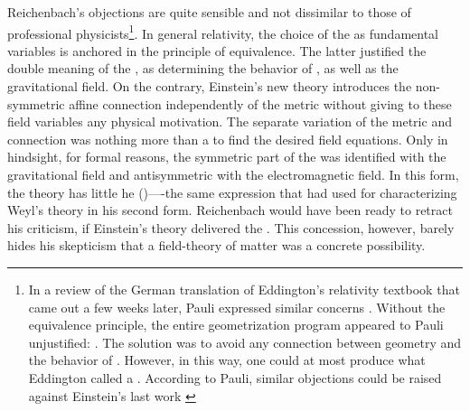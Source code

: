 \documentclass[draft]{article}
\newcommand{\WT}{Weyl's theory\xspace}
\begin{document}
Reichenbach's objections are quite sensible and not dissimilar to those of professional physicists\footnote{In a review of the German translation \citep{Eddington1925} of Eddington's relativity textbook \citep{Eddington1923} that came out a few weeks later, Pauli expressed similar concerns \citet{Pauli1926}. Without the equivalence principle, the entire geometrization program appeared to Pauli unjustified:  \citep{Pauli1926}. The solution was to avoid any connection between geometry and the behavior of \rac. However, in this way, one could at most produce what Eddington called a . According to Pauli, similar objections could be raised against Einstein's last work \citep{Einstein1925}}. In general relativity, the choice of the \gmn as fundamental variables is anchored in the principle of equivalence. The latter justified the double meaning of the \gmn, as determining the behavior of \rac, as well as the gravitational field. On the contrary, Einstein's new theory introduces the non-symmetric affine connection \Gtmn independently of the metric \gmn without giving to these field variables any physical motivation. The separate variation of the metric and connection was nothing more than a  to find the desired field equations. Only in hindsight, for formal reasons, the symmetric part of the \gmn was identified with the gravitational field and antisymmetric with the electromagnetic field. In this form, the theory has little he  ()----the same expression that \citet[367]{Reichenbach1921} had used for characterizing \WT in his second form. Reichenbach would have been ready to retract his criticism, if Einstein's theory delivered the . This concession, however, barely hides his skepticism that a field-theory of matter was a concrete possibility.
\end{document}
